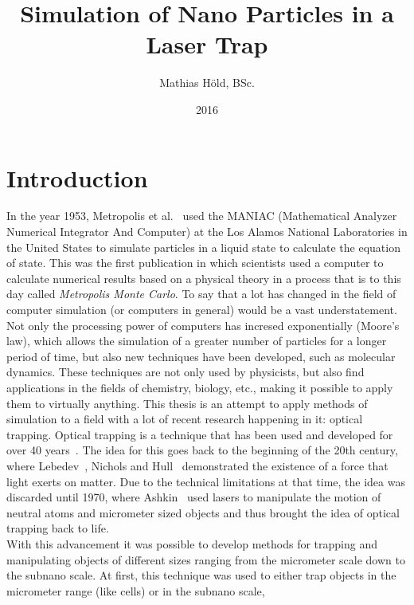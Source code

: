 \documentclass[12pt]{article}
\begin{document}
\title{Simulation of Nano Particles in a Laser Trap}
\author{Mathias H\"old, BSc.}
\date{2016}
\maketitle
\thispagestyle{empty}
\newpage
\tableofcontents
\newpage
\section{Introduction}
In the year 1953, Metropolis et al.~\cite{Metropolis1953} used the MANIAC (Mathematical Analyzer Numerical Integrator And Computer) 
at the Los Alamos National Laboratories in the United States to
simulate particles in a liquid state to calculate the equation of state. This was the first publication in which scientists used a computer to
calculate numerical results based on a physical theory in a process that is to this day called \textit{Metropolis Monte Carlo}. To say that a lot has
changed in the field of computer simulation (or computers in general) would be a vast understatement.\\
Not only the processing power of computers has incresed exponentially (Moore's law), which allows the simulation of a greater number of particles for
a longer period of time, but also new techniques have been developed, such as molecular dynamics. These techniques are not only used by physicists,
but also find applications in the fields of chemistry, biology, etc., making it possible to apply them to virtually anything. This thesis is an
attempt to apply methods of simulation to a field with a lot of recent research happening in it: optical trapping.
Optical trapping is a technique that has been used and developed for over 40 years~\cite{Marago2013}. The idea for this goes back to the beginning of
the 20th century, where Lebedev~\cite{Lebedew1901}, Nichols and Hull~\cite{Nichols1901} demonstrated the existence of a force that light exerts on 
matter. Due to the technical limitations at that time, the idea was discarded until 1970, where Ashkin~\cite{Ashkin2000} used lasers to manipulate the
motion of neutral atoms and micrometer sized objects and thus brought the idea of optical trapping back to life.\\
With this advancement it was possible to develop methods for trapping and manipulating objects of different sizes ranging from the micrometer scale
down to the subnano scale. At first, this technique was used to either trap objects in the micrometer range (like cells) or in the subnano scale,
\end{document}
